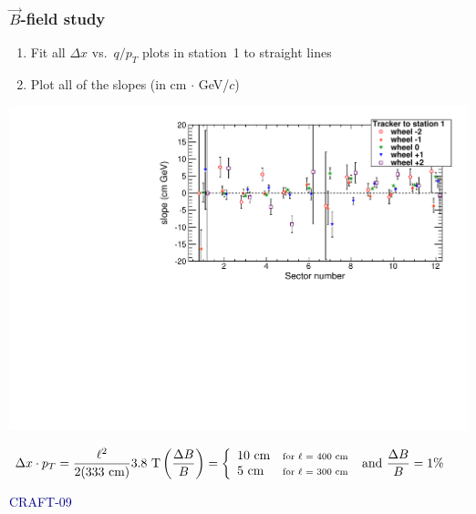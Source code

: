 \documentclass[compress]{beamer}
\begin{document}
\begin{frame}
\frametitle{$\vec{B}$-field study}

\begin{enumerate}
\item Fit all $\Delta x$ vs.\ $q/p_T$ plots in station~1 to straight lines
\item Plot all of the slopes (in cm $\cdot$ GeV/$c$)
\end{enumerate}

\includegraphics[width=\linewidth]{bfield_slopes.pdf}

\vspace{-0.5 cm}
\[ \hspace{-0.5 cm} \Delta x \cdot p_T = \frac{\ell^2}{2 (333~\mbox{cm})} 3.8~\mbox{T} \left(\frac{\Delta B}{B}\right) = \left\{\begin{array}{l l} 10~\mbox{cm} & \mbox{\scriptsize for $\ell$ = 400~cm} \\ 5~\mbox{cm} & \mbox{\scriptsize for $\ell$ = 300~cm} \end{array} \right. \mbox{ and } \frac{\Delta B}{B} = 1\% \]

\vspace{-0.25 cm}
\hfill \textcolor{darkblue}{\scriptsize CRAFT-09}

\vspace{0.25 cm}
\end{frame}
\end{document}
